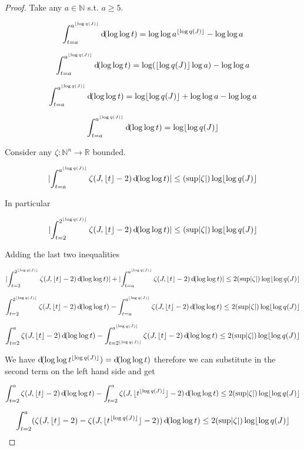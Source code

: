 \documentclass[11pt]{article}
\numberwithin{equation}{section}
\theoremstyle{definition}
\theoremstyle{plain}
\newcommand{\Nats}{\mathbb{N}}
\newcommand{\Reals}{\mathbb{R}}
\newcommand{\NatFun}{\Nats^n \rightarrow}
\newcommand{\Abs}[1]{\lvert #1 \rvert}
\newcommand{\Floor}[1]{\lfloor #1 \rfloor}
\begin{document}
\begin{proof}

Take any ${a \in \Nats}$ s.t. ${a \geq 5}$.

\[\int_{t = a}^{a^{\Floor{\log q(J)}}} \dif (\log \log t) = \log \log a^{\Floor{\log q(J)}} - \log \log a\]

\[\int_{t = a}^{a^{\Floor{\log q(J)}}} \dif (\log \log t) = \log (\Floor{\log q(J)} \log a) - \log \log a\]

\[\int_{t = a}^{a^{\Floor{\log q(J)}}} \dif (\log \log t) = \log \Floor{\log q(J)} + \log \log a - \log \log a\]

\[\int_{t = a}^{a^{\Floor{\log q(J)}}} \dif (\log \log t) = \log \Floor{\log q(J)}\]

Consider any ${\zeta: \NatFun \Reals}$ bounded.

\[\Abs{\int_{t = a}^{a^{\Floor{\log q(J)}}} \zeta(J,\Floor{t}-2) \dif (\log \log t)} \leq (\sup \Abs{\zeta}) \log \Floor{\log q(J)}\]

In particular

\[\Abs{\int_{t = 2}^{2^{\Floor{\log q(J)}}} \zeta(J,\Floor{t}-2) \dif (\log \log t)} \leq (\sup \Abs{\zeta}) \log \Floor{\log q(J)}\]

Adding the last two inequalities

\[\Abs{\int_{t = 2}^{2^{\Floor{\log q(J)}}} \zeta(J,\Floor{t}-2) \dif (\log \log t)} + \Abs{\int_{t = a}^{a^{\Floor{\log q(J)}}} \zeta(J,\Floor{t}-2) \dif (\log \log t)} \leq 2(\sup \Abs{\zeta}) \log \Floor{\log q(J)}\]

\[\int_{t = 2}^{2^{\Floor{\log q(J)}}} \zeta(J,\Floor{t}-2) \dif (\log \log t) - \int_{t = a}^{a^{\Floor{\log q(J)}}} \zeta(J,\Floor{t}-2) \dif (\log \log t) \leq 2(\sup \Abs{\zeta}) \log \Floor{\log q(J)}\]

\[\int_{t = 2}^{a} \zeta(J,\Floor{t}-2) \dif (\log \log t) - \int_{t=2^{\Floor{\log q(J)}}}^{a^{\Floor{\log q(J)}}} \zeta(J,\Floor{t}-2) \dif (\log \log t) \leq 2(\sup \Abs{\zeta}) \log \Floor{\log q(J)}\]

We have ${\dif (\log \log t^{\Floor{\log q(J)}}) = \dif(\log \log t)}$ therefore we can substitute in the second term on the left hand side and get

\[\int_{t = 2}^{a} \zeta(J,\Floor{t}-2) \dif (\log \log t) - \int_{t=2}^{a} \zeta(J,\Floor{t^{\Floor{\log q(J)}}}-2) \dif (\log \log t) \leq 2(\sup \Abs{\zeta}) \log \Floor{\log q(J)}\]

\[\int_{t = 2}^{a} (\zeta(J,\Floor{t}-2) - \zeta(J,\Floor{t^{\Floor{\log q(J)}}}-2)) \dif (\log \log t) \leq 2(\sup \Abs{\zeta}) \log \Floor{\log q(J)}\]


\end{proof}
\end{document}
